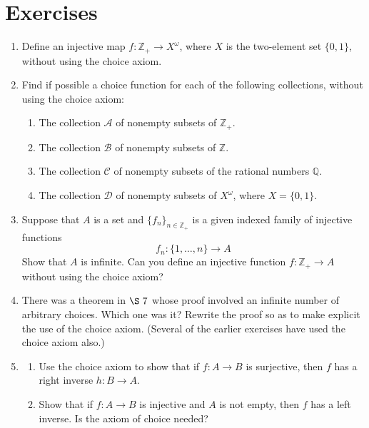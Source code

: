 \section*{Exercises}
\begin{enumerate}[itemsep=0.4em, parsep=0pt, topsep=0pt, partopsep=0pt, leftmargin=*, label=\arabic*., ref=\arabic*]
\item Define an injective map \(f : \mathbb{Z}_{+} \rightarrow {X}^{\omega }\), where \(X\) is the two-element set \(\{ 0,1\}\), without using the choice axiom.
\item Find if possible a choice function for each of the following collections, without using the choice axiom:
  \begin{enumerate}[itemsep=0.2em, parsep=0pt, topsep=0pt, partopsep=0pt, leftmargin=*, label=(\alph*), align=left]
  \item The collection \(\mathcal{A}\) of nonempty subsets of \(\mathbb{Z}_{+}\).
  \item The collection \(\mathcal{B}\) of nonempty subsets of \(\mathbb{Z}\).
  \item The collection \(\mathcal{C}\) of nonempty subsets of the rational numbers \(\mathbb{Q}\).
  \item The collection \(\mathcal{D}\) of nonempty subsets of \(X^{\omega }\), where \(X = \{ 0,1\}\).
  \end{enumerate}
\item Suppose that \(A\) is a set and \({\{ f_{n}\} }_{n \in {\mathbb{Z}}_{+}}\) is a given indexed family of injective functions \[ f_{n} : \{1,\ldots, n\} \rightarrow A \] Show that \(A\) is infinite. Can you define an injective function \(f : \mathbb{Z}_{+} \rightarrow A\) without using the choice axiom?
\item There was a theorem in \(\S\ 7\) whose proof involved an infinite number of arbitrary choices. Which one was it? Rewrite the proof so as to make explicit the use of the choice axiom. (Several of the earlier exercises have used the choice axiom also.)
\item
  \begin{enumerate}[itemsep=0.2em, parsep=0pt, topsep=0pt, partopsep=0pt, leftmargin=*, label=(\alph*), align=left]
  \item Use the choice axiom to show that if \(f : A \rightarrow B\) is surjective, then \(f\) has a right inverse \(h \colon B \rightarrow A\).
  \item Show that if \(f : A \rightarrow B\) is injective and \(A\) is not empty, then \(f\) has a left inverse. Is the axiom of choice needed?

\end{enumerate}
\end{enumerate}
